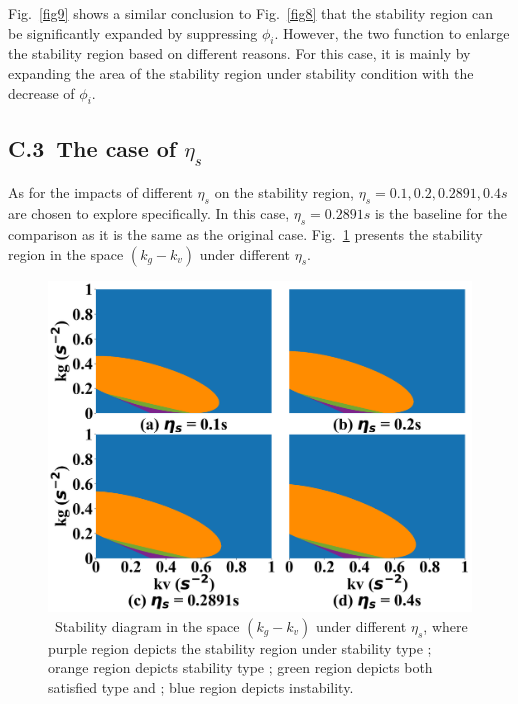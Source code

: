 \documentclass[a4paper]{cas-sc}
\begin{document}
Fig.~\ref{fig9} shows a similar conclusion to Fig.~\ref{fig8} that the stability region can be significantly expanded by suppressing $\phi_i$. However, the two function to enlarge the stability region based on different reasons. For this case, it is mainly by expanding the area of the stability region under stability condition \uppercase\expandafter{} with the decrease of $\phi_i$.

\subsection*{C.3~The case of $\eta_s$}

As for the impacts of different $\eta_s$ on the stability region, $\eta_s=0.1,0.2,0.2891,0.4s$ are chosen to explore specifically. In this case, $\eta_s=0.2891s$ is the baseline for the comparison as it is the same as the original case. Fig.~\ref{fig10} presents the stability region in the space $(k_g-k_v)$ under different $\eta_s$.

\begin{figure}
  \centering
  \includegraphics[width=14cm]{figs/fig10.png}
  \caption{~Stability diagram in the space $(k_g-k_v)$ under different $\eta_s$, where purple region depicts the stability region under stability type \uppercase\expandafter{}; orange region depicts stability type \uppercase\expandafter{}; green region depicts both satisfied type \uppercase\expandafter{} and \uppercase\expandafter{}; blue region depicts instability.}
  \label{fig10}
\end{figure}
\end{document}
